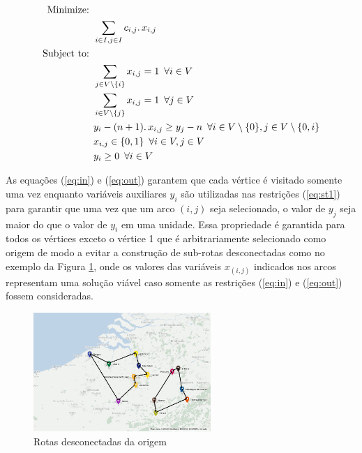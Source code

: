 \documentclass[a4paper,11pt,fleqn]{article}
\begin{document}
\begin{align}
    \textrm{Minimize: }   & \nonumber \\
    &  \sum_{i \in I, j \in I} c_{i,j} \ldotp x_{i,j} \\
    \textrm{Subject to: }   & \nonumber \\
    & \sum_{j \in V \setminus \{i\}} x_{i,j} = 1 \,\,\, \forall i \in V \label{eq:in}  \\
    & \sum_{i \in V \setminus \{j\}} x_{i,j} = 1 \,\,\, \forall j \in V \label{eq:out} \\
    & y_{i} -(n+1)\ldotp x_{i,j} \geq y_{j} -n  \,\,\, \forall i \in V\setminus \{0\}, j \in V\setminus \{0,i\} \label{eq:st1} \\
    & x_{i,j} \in \{0,1\} \,\,\, \forall i \in V, j \in V \\
    & y_i \geq 0 \,\,\, \forall i \in V 
\end{align}

As equações (\ref{eq:in}) e (\ref{eq:out}) garantem que cada vértice
é visitado somente uma vez enquanto variáveis auxiliares $y_{i}$
são utilizadas nas restrições (\ref{eq:st1}) para garantir que uma vez
que um arco $(i,j)$ seja selecionado, o valor de $y_{j}$ seja maior
do que o valor de $y_{i}$ em uma unidade. Essa propriedade é garantida
para todos os vértices exceto o vértice 1 que é arbitrariamente selecionado
como origem de modo a evitar a construção de sub-rotas desconectadas
como no exemplo da Figura \ref{figSub}, onde os valores das variáveis
$x_{(i,j)}$ indicados nos arcos representam uma solução viável caso
somente as restrições (\ref{eq:in}) e (\ref{eq:out}) fossem consideradas.

\begin{figure}
	\begin{centering}
		\includegraphics[width=0.6\textwidth]{belgium-tourism-14-subtour.png}
		\par\end{centering}
	\caption{Rotas desconectadas da origem}
	\label{figSub}
	
\end{figure}
\end{document}
